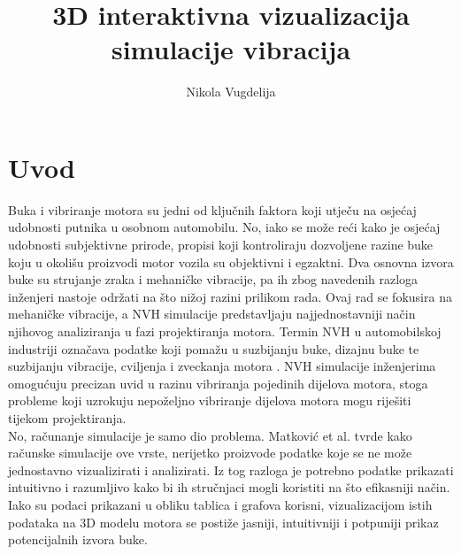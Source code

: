 \documentclass[times, utf8, diplomski]{fer}
\begin{document}

\title{3D interaktivna vizualizacija simulacije vibracija}

\author{Nikola Vugdelija}

\maketitle





\tableofcontents

\listoffigures

\chapter{Uvod}
Buka i vibriranje motora su jedni od ključnih faktora koji utječu na osjećaj udobnosti putnika u osobnom automobilu. No, iako se može reći kako je osjećaj udobnosti subjektivne prirode, propisi koji kontroliraju dozvoljene razine buke koju u okolišu proizvodi motor vozila su objektivni i egzaktni. Dva osnovna izvora buke su strujanje zraka i mehaničke vibracije, pa ih zbog navedenih razloga inženjeri nastoje održati na što nižoj razini prilikom rada. Ovaj rad se fokusira na mehaničke vibracije, a NVH  simulacije predstavljaju najjednostavniji način njihovog analiziranja u fazi projektiranja motora. Termin NVH u automobilskoj industriji označava podatke koji pomažu u suzbijanju buke, dizajnu buke te suzbijanju vibracije, cviljenja i zveckanja motora \citep{harrison2004vehicle}. NVH simulacije inženjerima omogućuju precizan uvid u razinu vibriranja pojedinih dijelova motora, stoga probleme koji uzrokuju nepoželjno vibriranje dijelova motora mogu riješiti tijekom projektiranja.\\

No, računanje simulacije je samo dio problema. Matković et al. \citep{matkovic2021getting} tvrde kako računske simulacije ove vrste, nerijetko proizvode podatke koje se ne može jednostavno vizualizirati i analizirati. Iz tog razloga je potrebno podatke prikazati intuitivno i razumljivo kako bi ih stručnjaci mogli koristiti na što efikasniji način. Iako su podaci prikazani u obliku tablica i grafova korisni, vizualizacijom istih podataka na 3D modelu motora se postiže jasniji, intuitivniji i potpuniji prikaz potencijalnih izvora buke.\\
\end{document}
